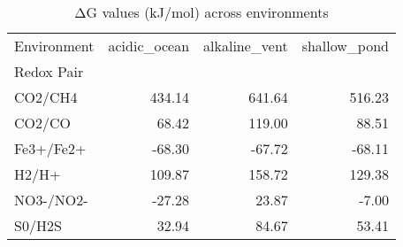 \begin{table}
\centering
\caption{ΔG values (kJ/mol) across environments}
\label{tab:dg_env}
\begin{tabular}{lrrr}
\toprule
Environment &  acidic\_ocean &  alkaline\_vent &  shallow\_pond \\
Redox Pair &               &                &               \\
\midrule
CO2/CH4    &        434.14 &         641.64 &        516.23 \\
CO2/CO     &         68.42 &         119.00 &         88.51 \\
Fe3+/Fe2+  &        -68.30 &         -67.72 &        -68.11 \\
H2/H+      &        109.87 &         158.72 &        129.38 \\
NO3-/NO2-  &        -27.28 &          23.87 &         -7.00 \\
S0/H2S     &         32.94 &          84.67 &         53.41 \\
\bottomrule
\end{tabular}
\end{table}
